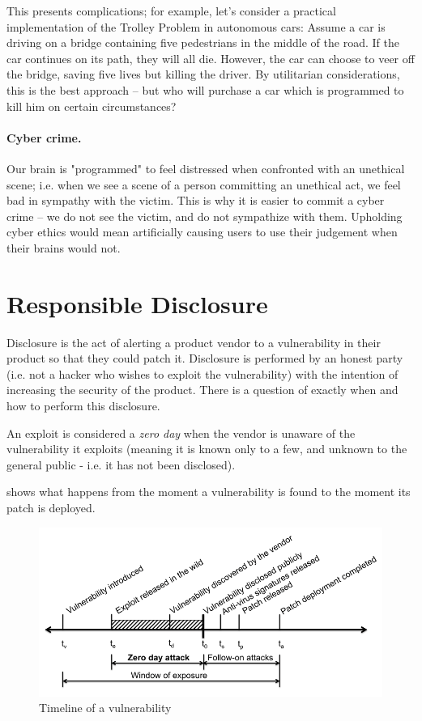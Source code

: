 This presents complications; for example, let’s consider a practical implementation of the Trolley Problem in autonomous cars:
Assume a car is driving on a bridge containing five pedestrians in the middle of the road. If the car continues on its path, they will all die. However, the car can choose to veer off the bridge, saving five lives but killing the driver. By utilitarian considerations, this is the best approach – but who will purchase a car which is programmed to kill him on certain circumstances?


\paragraph{Cyber crime.} Our brain is "programmed" to feel distressed when confronted with an unethical scene; i.e. when we see a scene of a person committing an unethical act, we feel bad in sympathy with the victim. This is why it is easier to commit a cyber crime -- we do not see the victim, and do not sympathize with them. Upholding cyber ethics would mean artificially causing users to use their judgement when their brains would not.


\section{Responsible Disclosure}
Disclosure is the act of alerting a product vendor to a vulnerability in their product so that they could patch it. Disclosure is performed by an honest party (i.e. not a hacker who wishes to exploit the vulnerability) with the intention of increasing the security of the product. There is a question of exactly when and how to perform this disclosure.


An exploit is considered a \textit{zero day} when the vendor is unaware of the vulnerability it exploits (meaning it is known only to a few, and unknown to the general public - i.e. it has not been disclosed).

 shows what happens from the moment a vulnerability is found to the moment its patch is deployed.


\begin{figure}[!ht]
    \centering
    \includegraphics[width=\textwidth]{images/Vulnerability_Timeline.PNG}
    \caption{Timeline of a vulnerability}
    \label{fig:vulnerability_timeline}
\end{figure}


